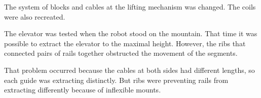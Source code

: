 \begin{enumerate*}
  \begin{figure}[H]
  	\begin{minipage}[h]{1\linewidth}
  		\caption{}
  	\end{minipage}
  \end{figure}


  \item The system of blocks and cables at the lifting mechanism was changed. The coils were also recreated.

  \item The elevator was tested when the robot stood on the mountain. That time it was possible to extract the elevator to the maximal height. However, the ribs that connected pairs of rails together obstructed the movement of the segments.

  That problem occurred because the cables at both sides had different lengths, so each guide was extracting distinctly. But ribs were preventing rails from extracting differently because of inflexible mounts.


\end{enumerate*}
